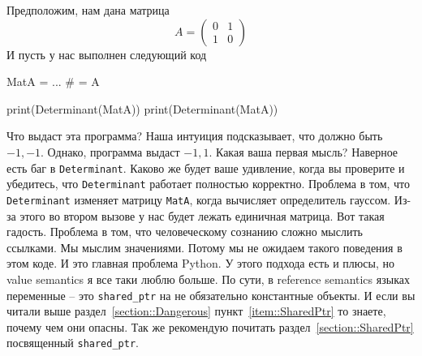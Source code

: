 Предположим, нам дана матрица
\[
A = 
\begin{pmatrix}
{0}&{1}\\
{1}&{0}
\end{pmatrix}
\]
И пусть у нас выполнен следующий код
\begin{pythoncode}
MatA = ...
# = A

print(Determinant(MatA))
print(Determinant(MatA))
\end{pythoncode}
Что выдаст эта программа?
Наша интуиция подсказывает, что должно быть $-1, -1$.
Однако, программа выдаст $-1, 1$.
Какая ваша первая мысль?
Наверное есть баг в \verb"Determinant".
Каково же будет ваше удивление, когда вы проверите и убедитесь, что \verb"Determinant" работает полностью корректно.
Проблема в том, что \verb"Determinant" изменяет матрицу \verb"MatA", когда вычисляет определитель гауссом.
Из-за этого во втором вызове у нас будет лежать единичная матрица.
Вот такая гадость.
Проблема в том, что человеческому сознанию сложно мыслить ссылками.
Мы мыслим значениями.
Потому мы не ожидаем такого поведения в этом коде.
И это главная проблема Python.
У этого подхода есть и плюсы, но value semantics я все таки люблю больше.
По сути, в reference semantics языках переменные -- это \verb"shared_ptr" на не обязательно константные объекты.
И если вы читали выше раздел~\ref{section::Dangerous} пункт~\ref{item::SharedPtr} то знаете, почему чем они опасны.
Так же рекомендую почитать раздел~\ref{section::SharedPtr} посвященный \verb"shared_ptr".

